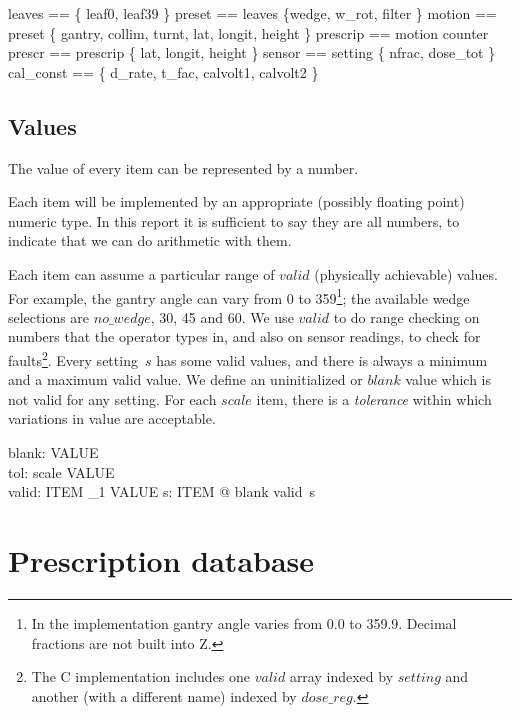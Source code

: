 \begin{zed}
	leaves == \{ leaf0, leaf39 \}
\also
	preset == leaves \cup \{wedge, w\_rot, filter \}
\also
	motion == preset \cup \{ gantry, collim, turnt, lat, longit, height \}
\also
	prescrip == motion \cup counter 
\also
	prescr == prescrip \setminus \{ lat, longit, height \}
\also
	sensor == setting \setminus \{ nfrac, dose\_tot \}
\also
	cal\_const == \{ d\_rate, t\_fac, calvolt1, calvolt2 \}
\end{zed}

\subsection{Values} \label{sect:values}

The value of every item can be represented by a number.

Each item will be implemented by an appropriate
(possibly floating point) numeric type.  In this report it is
sufficient to say they are all numbers, to indicate that we can
do arithmetic with them.

Each item can assume a particular range of $valid$ (physically
achievable) values.  For example, the gantry angle can vary from 0 to
359\footnote{In the implementation gantry angle varies from 0.0 to
359.9. Decimal fractions are not built into Z.}; the available wedge
selections are $no\_wedge$, 30, 45 and 60.  We use $valid$ to do range
checking on numbers that the operator types in, and also on
sensor readings, to check for faults\footnote{The
C implementation includes one $valid$ array indexed by $setting$ and
another (with a different name) indexed by $dose\_reg$.}.  Every
setting~$s$ has some valid values, and there is always a minimum and a
maximum valid value. We define
an uninitialized or $blank$ value which is not valid for any setting.
For each $scale$ item, there is a {\em tolerance} within which
variations in value are acceptable.

\begin{axdef}
	blank: VALUE \\
        tol: scale \fun VALUE \\
	valid: ITEM \fun \finset_1 VALUE
\where
	\forall s: ITEM @ blank \notin valid~s \\
\end{axdef}

\section{Prescription database} \label{sect:prescr}

